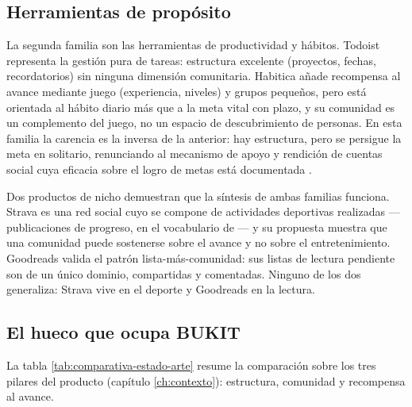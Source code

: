\subsection{Herramientas de propósito}
\label{sec:estado-arte-herramientas}

La segunda familia son las herramientas de productividad y hábitos.
Todoist \parencite{todoist-app} representa la gestión pura de tareas: estructura excelente (proyectos, fechas, recordatorios) sin ninguna dimensión comunitaria.
Habitica \parencite{habitica-app} añade recompensa al avance mediante juego (experiencia, niveles) y grupos pequeños, pero está orientada al hábito diario más que a la meta vital con plazo, y su comunidad es un complemento del juego, no un espacio de descubrimiento de personas.
En esta familia la carencia es la inversa de la anterior: hay estructura, pero se persigue la meta en solitario, renunciando al mecanismo de apoyo y rendición de cuentas social cuya eficacia sobre el logro de metas está documentada \parencite{harkin-monitoring}.

Dos productos de nicho demuestran que la síntesis de ambas familias funciona.
Strava \parencite{strava-app} es una red social cuyo  se compone de actividades deportivas realizadas —publicaciones de progreso, en el vocabulario de \bukit— y su propuesta muestra que una comunidad puede sostenerse sobre el avance y no sobre el entretenimiento.
Goodreads \parencite{goodreads-app} valida el patrón lista-más-comunidad: sus listas de lectura pendiente son  de un único dominio, compartidas y comentadas.
Ninguno de los dos generaliza: Strava vive en el deporte y Goodreads en la lectura.

\subsection{El hueco que ocupa BUKIT}
\label{sec:estado-arte-hueco}

La tabla \ref{tab:comparativa-estado-arte} resume la comparación sobre los tres pilares del producto (capítulo \ref{ch:contexto}): estructura, comunidad y recompensa al avance.

